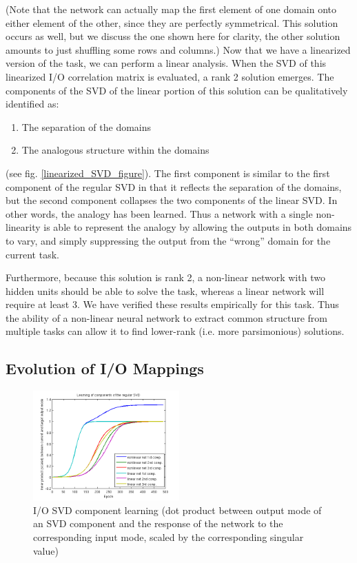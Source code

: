\documentclass[10pt,letterpaper]{article}
\begin{document}
(Note that the network can actually map the first element of one domain onto either element of the other, since they are perfectly symmetrical. This solution occurs as well, but we discuss the one shown here for clarity, the other solution amounts to just shuffling some rows and columns.) Now that we have a linearized version of the task, we can perform a linear analysis. When the SVD of this linearized I/O correlation matrix is evaluated, a rank 2 solution emerges. The components of the SVD of the linear portion of this solution can be qualitatively identified as: \begin{enumerate}
\item The separation of the domains
\item The analogous structure within the domains
\end{enumerate}
(see fig. \ref{linearized_SVD_figure}). The first component is similar to the first component of the regular SVD in that it reflects the separation of the domains, but the second component collapses the two components of the linear SVD. In other words, the analogy has been learned. Thus a network with a single non-linearity is able to represent the analogy by allowing the outputs in both domains to vary, and simply suppressing the output from the ``wrong'' domain for the current task.\par
Furthermore, because this solution is rank 2, a non-linear network with two hidden units should be able to solve the task, whereas a linear network will require at least 3. We have verified these results empirically for this task. Thus the ability of a non-linear neural network to extract common structure from multiple tasks can allow it to find lower-rank (i.e. more parsimonious) solutions. 
 
 
\subsection{Evolution of I/O Mappings}
\begin{figure}
\centering
\includegraphics[width=0.5\textwidth]{figures/regular_SVD_component_learning.png}
\caption{I/O SVD component learning (dot product between output mode of an SVD component and the response of the network to the corresponding input mode, scaled by the corresponding singular value)}
\label{regular_SVD_component_learning}
\end{figure}
\end{document}

